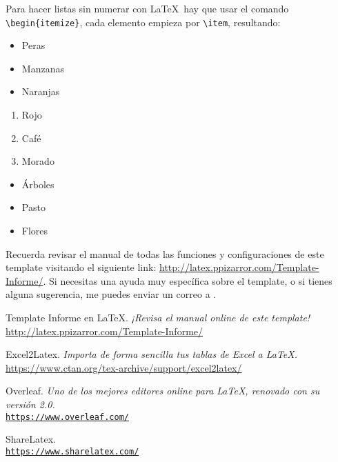 		Para hacer listas sin numerar con \LaTeX\ hay que usar el comando \texttt{\textbackslash begin\{itemize\}}, cada elemento empieza por \texttt{\textbackslash item}, resultando:
		
		\begin{multicols}{3}
			\begin{itemize}[label={--}]
				\item Peras
				\item Manzanas
				\item Naranjas
			\end{itemize}
			
			\begin{enumerate}[label={*}]
				\item Rojo
				\item Café
				\item Morado
			\end{enumerate}
			
			\begin{itemize}
				\item Árboles
				\item Pasto
				\item Flores
			\end{itemize}
		\end{multicols}
		
		
		Recuerda revisar el manual de todas las funciones y configuraciones de este template visitando el siguiente link: \url{http://latex.ppizarror.com/Template-Informe/}. Si necesitas una ayuda muy específica sobre el template, o si tienes alguna sugerencia, me puedes enviar un correo a .

\newpage %
\begin{references}
	Template Informe en \LaTeX.
	\textit{¡Revisa el manual online de este template!} \\
	\url{http://latex.ppizarror.com/Template-Informe/}
	
	Excel2Latex.
	\textit{Importa de forma sencilla tus tablas de Excel a \LaTeX.} \\
	\url{https://www.ctan.org/tex-archive/support/excel2latex/}
	
	Overleaf.
	\textit{Uno de los mejores editores online para \LaTeX, renovado con su versión 2.0.} \\
	\href{https://www.overleaf.com/signup?ref=4d3bd09b7e78}{\texttt{https://www.overleaf.com/}}
	
	ShareLatex. \\
	\href{https://www.sharelatex.com/?r=298b935f&rm=d&rs=b}{\texttt{https://www.sharelatex.com/}}
\end{references}

